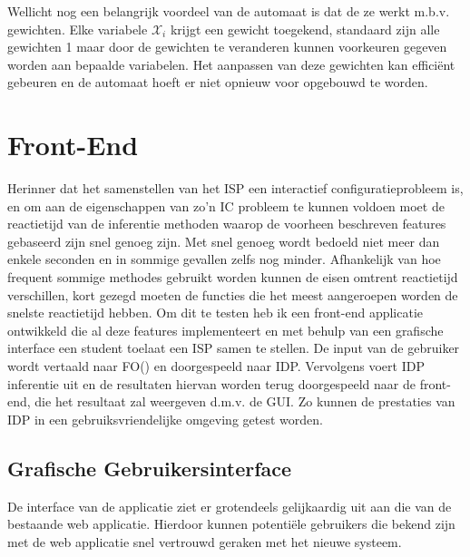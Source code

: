 Wellicht nog een belangrijk voordeel van de automaat is dat de ze werkt m.b.v. gewichten. Elke variabele $\mathcal{X}_{i}$ krijgt een gewicht toegekend, standaard zijn alle gewichten 1 maar door de gewichten te veranderen kunnen voorkeuren gegeven worden aan bepaalde variabelen. Het aanpassen van deze gewichten kan effici\"{e}nt gebeuren en de automaat hoeft er niet opnieuw voor opgebouwd te worden.

\section{Front-End}
Herinner dat het samenstellen van het ISP een interactief configuratieprobleem is, en om aan de eigenschappen van zo'n IC probleem te kunnen voldoen moet de reactietijd van de inferentie methoden waarop de voorheen beschreven features gebaseerd zijn snel genoeg zijn. Met snel genoeg wordt bedoeld niet meer dan enkele seconden en in sommige gevallen zelfs nog minder. Afhankelijk van hoe frequent sommige methodes gebruikt worden kunnen de eisen omtrent reactietijd verschillen, kort gezegd moeten de functies die het meest aangeroepen worden de snelste reactietijd hebben. Om dit te testen heb ik een front-end applicatie ontwikkeld die al deze features implementeert en met behulp van een grafische interface een student toelaat een ISP samen te stellen. De input van de gebruiker wordt vertaald naar FO(\textperiodcentered) en doorgespeeld naar IDP. Vervolgens voert IDP inferentie uit en de resultaten hiervan worden terug doorgespeeld naar de front-end, die het resultaat zal weergeven d.m.v. de GUI. Zo kunnen de prestaties van IDP in een gebruiksvriendelijke omgeving getest worden. 

\subsection{Grafische Gebruikersinterface}
De interface van de applicatie ziet er grotendeels gelijkaardig uit aan die van de bestaande web applicatie. Hierdoor kunnen potenti\"{e}le gebruikers die bekend zijn met de web applicatie snel vertrouwd geraken met het nieuwe systeem. 

